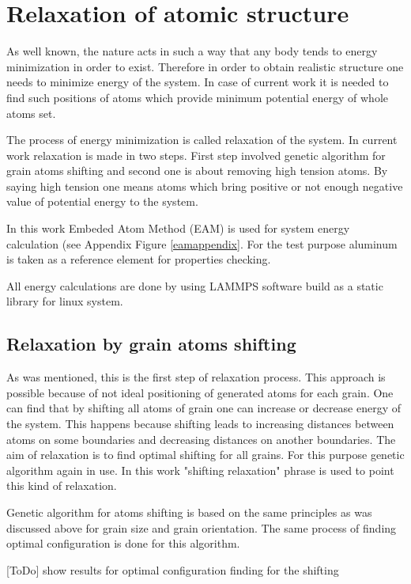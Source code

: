 \documentclass[12pt]{report}
\begin{document}
\section{Relaxation of atomic structure}

As well known, the nature acts in such a way that any body tends to energy minimization in order to exist. Therefore in order to obtain realistic structure one needs to minimize energy of the system. In case of current work it is needed to find such positions of atoms which provide minimum potential energy of whole atoms set.

The process of energy minimization is called relaxation of the system. In current work relaxation is made in two steps. First step involved genetic algorithm for grain atoms shifting and second one is about removing high tension atoms. By saying high tension one means atoms which bring positive or not enough negative value of potential energy to the system.

In this work Embeded Atom Method (EAM) is used for system energy calculation (see Appendix Figure \ref{eamappendix}. For the test purpose aluminum is taken as a reference element for properties checking. 

All energy calculations are done by using LAMMPS software build as a static library for linux system.

\subsection{Relaxation by grain atoms shifting}

As was mentioned, this is the first step of relaxation process. This approach is possible because of not ideal positioning of generated atoms for each grain. One can find that by shifting all atoms of grain one can increase or decrease energy of the system. This happens because shifting leads to increasing distances between atoms on some boundaries and decreasing distances on another boundaries. The aim of relaxation is to find optimal shifting for all grains. For this purpose genetic algorithm again in use. In this work "shifting relaxation" phrase is used to point this kind of relaxation.

Genetic algorithm for atoms shifting is based on the same principles as was discussed above for grain size and grain orientation. The same process of finding optimal configuration is done for this algorithm. 

[ToDo] show results for optimal configuration finding for the shifting
\end{document}
